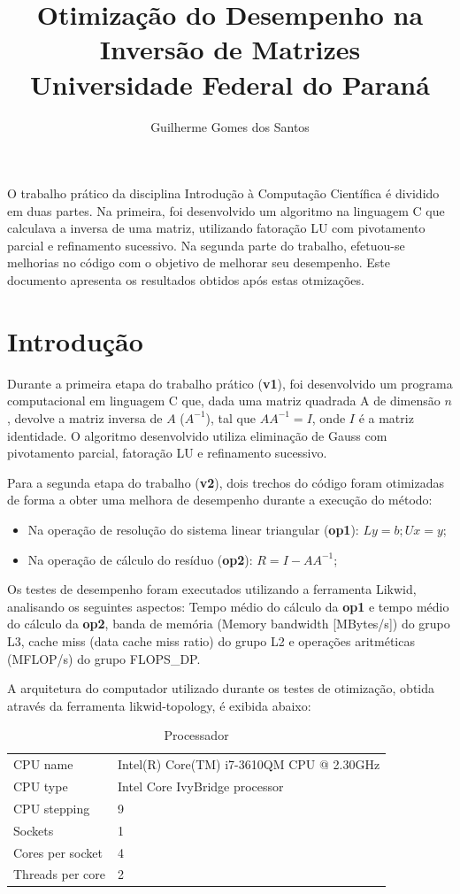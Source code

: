 \documentclass[12pt]{article}
\title{Otimização do Desempenho na Inversão de Matrizes\\ Universidade Federal do Paraná}
\author{Guilherme Gomes dos Santos\inst{1}}
\begin{document}
\maketitle

\begin{resumo}
 O trabalho prático da disciplina Introdução à Computação Científica é dividido em duas partes. Na primeira, foi desenvolvido um algoritmo na linguagem C que calculava a inversa de uma matriz, utilizando fatoração LU com pivotamento parcial e refinamento sucessivo. Na segunda parte do trabalho, efetuou-se melhorias no código com o objetivo de melhorar seu desempenho. Este documento apresenta os resultados obtidos após estas otmizações.
\end{resumo}

\section{Introdução}
Durante a primeira etapa do trabalho prático (\textbf{v1}), foi desenvolvido um programa computacional em linguagem C que, dada uma matriz quadrada A de dimensão $n$, devolve a matriz inversa de ${A}$ (${A}^{-1}$), tal que $A {A}^{-1} = I$, onde ${I}$ é a matriz identidade. O algoritmo desenvolvido utiliza eliminação de Gauss com pivotamento parcial, fatoração LU e refinamento sucessivo.

Para a segunda etapa do trabalho (\textbf{v2}), dois trechos do código foram otimizadas de forma a obter uma melhora de desempenho durante a execução do método:
\begin{itemize}
\item Na operação de resolução do sistema linear triangular (\textbf{op1}): $Ly = b; Ux = y$;
\item Na operação de cálculo do resíduo (\textbf{op2}): $R = I - A{A}^{-1}$;
\end{itemize}

Os testes de desempenho foram executados utilizando a ferramenta Likwid, analisando os seguintes aspectos: Tempo médio do cálculo da \textbf{op1} e tempo médio do cálculo da \textbf{op2}, banda de memória (Memory bandwidth [MBytes/s]) do grupo L3, cache miss (data cache miss ratio) do grupo L2 e operações aritméticas (MFLOP/s) do grupo FLOPS\_DP.

A arquitetura do computador utilizado durante os testes de otimização, obtida através da ferramenta likwid-topology, é exibida abaixo:


\begin{table}[H]
\centering
\caption{Processador}
\label{my-label}
\begin{tabular}{ll}
CPU name         & Intel(R) Core(TM) i7-3610QM CPU @ 2.30GHz \\
CPU type         & Intel Core IvyBridge processor            \\
CPU stepping     & 9                                       \\ \hline
Sockets          & 1                                       \\
Cores per socket & 4                                       \\
Threads per core & 2
\end{tabular}
\end{table}
\end{document}
